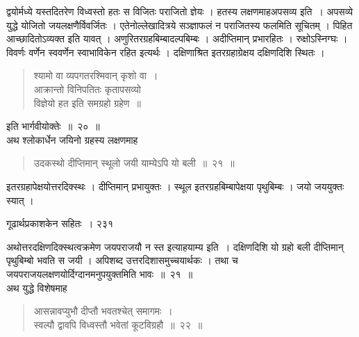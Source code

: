 \documentclass[11pt, openany]{book}
\begin{document}
 द्वयोर्मध्ये यस्तदितरेण विध्वस्तो हतः स विजितः पराजितो ज्ञेयः । हतस्य लक्षणमाह\textendash अपसव्य इति~। अपसव्ये युद्धे योजितो जयलक्षणैर्विवर्जितः । एतेनोल्लेखादित्रये सञ्ज्ञाफलं न पराजितस्य फलमिति सूचितम् । पिहित आच्छादितोऽव्यक्त इति यावत् । अणुरितरग्रहबिम्बादल्पबिम्बः । अदीप्तिमान् प्रभारहितः । रुक्षोऽस्निग्घः । विवर्णः वर्णेन स्ववर्णेन स्वाभाविकेन रहित इत्यर्थः । दक्षिणाश्रित इतरग्रहाग्रेक्षय दक्षिणदिशि स्थितः । 


\begin{quote}
{\qt श्यामो वा व्यपगतरश्मिवान् कृशो वा~। \\
 आक्रान्तो विनिपतितः कृतापसव्यो\\
विज्ञेयो हत इति समग्रहो ग्रहेण~॥ }
\end{quote}

इति भार्गवीयोक्तेः~॥~२०~॥\\
\noindent अथ श्लोकार्धेन जयिनो ग्रहस्य लक्षणमाह \textendash

\begin{quote}
{\ssi उदकस्थो दीप्तिमान् स्थूलो जयी याम्येऽपि यो बली~॥~२१~॥ }
\end{quote}

 इतरग्रहापेक्षयोत्तरदिक्स्थः । दीप्तिमान् प्रभायुक्तः । स्थूल इतरग्रहबिम्बापेक्षया पृथुबिम्बः । जयो जययुक्तः स्यात् ।

\newpage

\hspace{3cm}गूढार्थप्रकाशकेन सहितः~। \hfill २३१
\vspace{1cm}


\noindent अथोत्तरदक्षिणदिक्स्थत्वक्रमेण जयपराजयौ न स्त इत्याह\textendash  याम्य इति~। दक्षिणदिशि यो ग्रहो बली दीप्तिमान् पृथुबिम्बो भवति स जयी । अपिशब्द उत्तरदिशासमुच्चयार्थकः । तथा च जयपराजयलक्षणयोर्दिग्दानमनुपयुक्तमिति भावः~॥~२१~॥\\
\noindent अथ युद्धे विशेषमाह\textendash 


\begin{quote}
{\ssi आसन्नावप्युभौ दीप्तौ भवतश्चेत् समागमः~।\\
 स्वल्पौ द्वावपि विध्वस्तौ भवेतां कूटविग्रहौ~॥~२२~॥ }
\end{quote}
\end{document}

